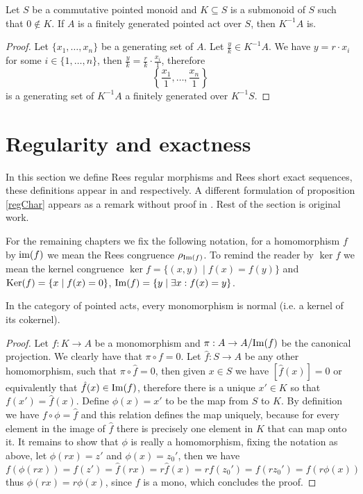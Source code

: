 \begin{proposition}
    Let $S$ be a commutative pointed monoid and $K\subseteq S$ is a submonoid of $S$ such that $0\not\in K$.
    If $A$ is a finitely generated pointed act over $S$, then $K^{-1} A$ is.
\end{proposition}
\begin{proof}
    Let $\{x_1,\dots,x_n\}$ be a generating set of $A$. Let $\frac{y}{k}\in K^{-1} A$. We have $y=r\cdot x_i$ for some $i\in\{1,\dots, n\}$,
    then $\frac{y}{k} = \frac{r}{k}\cdot\frac{x_i}{1}$, therefore 
    \[
        \left\{\frac{x_1}{1},\dots,\frac{x_n}{1}\right\}
    \]
    is a generating set of $K^{-1} A$ a finitely generated over $K^{-1}S$.
\end{proof}
\section{Regularity and exactness}
    In this section we define Rees regular morphisms and Rees short exact sequences, these definitions appear in \cite{Flores15} and \cite{Chen02} respectively. 
    A different formulation of proposition \ref{regChar} appears as a remark without proof in \cite{Flores15}. Rest of the section is original work. \par
    For the remaining chapters we fix the following notation, for a homomorphism $f$ by $\text{im}(f)$ we mean the 
    Rees congruence $\rho_{\mathrm{Im}(f)}$. To remind the reader by $\ker{f}$ we mean the kernel congruence $\ker{f} = \{(x,y) \mid f(x)=f(y)\}$
    and $\mathrm{Ker}(f) = \{x \mid f(x) = 0\}$, $\mathrm{Im}(f) = \{ y \mid \exists x : f(x) =y \}$.
\begin{proposition}
    In the category of pointed acts, every monomorphism is normal (i.e. a kernel of its cokernel). 
\end{proposition}
\begin{proof}[Proof]
    Let $f: K \to A$ be a monomorphism and $\pi : A \to A/\mathrm{Im}(f)$ be the canonical projection. We clearly have that 
    $\pi\circ f = 0$. Let $\hat{f} : S \to A$ be any other homomorphism, such that $\pi\circ\hat{f} = 0$, then 
    given $x\in S$ we have $[\hat{f}(x)]=0$ or equivalently that $\hat{f}(x)\in\mathrm{Im}(f)$, therefore there is a unique 
    $x'\in K$ so that $f(x')=\hat{f}(x)$. Define $\phi(x)=x'$ to be the map from $S$ to $K$. By definition we have 
    $f\circ\phi = \hat{f}$ and this relation defines the map uniquely, because for every element in the image of $\hat{f}$ there 
    is precisely one element in $K$ that can map onto it. It remains to show that $\phi$ is really a homomorphism, fixing the 
    notation as above, let $\phi(rx)=z'$ and $\phi(x)=z_0'$, then we have 
    \[
        f(\phi(rx))=f(z')=\hat{f}(rx)=r\hat{f}(x)=rf(z_0')=f(rz_0')=f(r\phi(x))
    \]
    thus $\phi(rx)=r\phi(x)$, since $f$ is a mono, which concludes the proof.
\end{proof}

